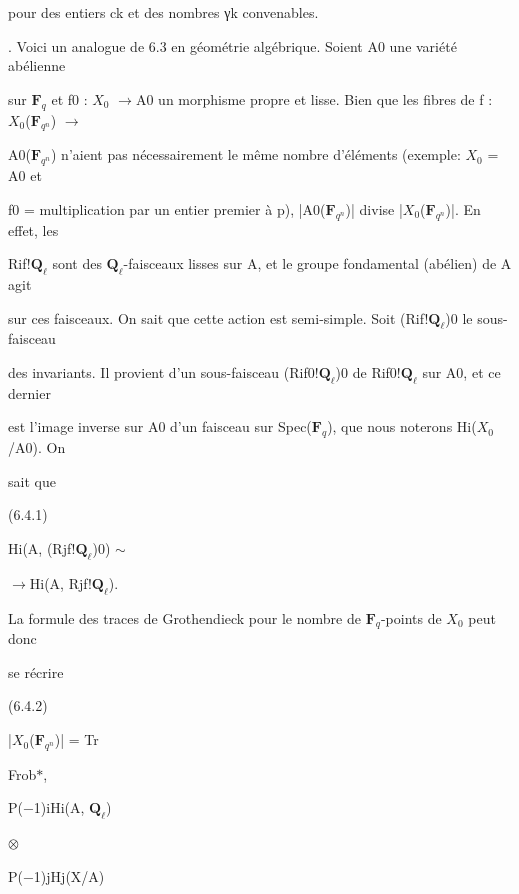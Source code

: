 \documentclass[11pt]{article}
\begin{document}
\noindent pour des entiers ck et des nombres γk convenables.\par
{}. Voici un analogue de 6.3 en géométrie algébrique. Soient A0 une variété abélienne\par
\noindent sur \(\mathbf F_q\) et f0 : \(X_0\) \(\to\)A0 un morphisme propre et lisse. Bien que les fibres de f : \(X_0\)(\(\mathbf F_{q^n}\)) \(\to\)\par
\noindent A0(\(\mathbf F_{q^n}\)) n’aient pas nécessairement le même nombre d’éléments (exemple: \(X_0\) = A0 et\par
\noindent f0 = multiplication par un entier premier à p), |A0(\(\mathbf F_{q^n}\))| divise |\(X_0\)(\(\mathbf F_{q^n}\))|. En effet, les\par
\noindent Rif!\(\mathbf Q_{\ell}\) sont des \(\mathbf Q_{\ell}\)-faisceaux lisses sur A, et le groupe fondamental (abélien) de A agit\par
\noindent sur ces faisceaux. On sait que cette action est semi-simple. Soit (Rif!\(\mathbf Q_{\ell}\))0 le sous-faisceau\par
\noindent des invariants. Il provient d’un sous-faisceau (Rif0!\(\mathbf Q_{\ell}\))0 de Rif0!\(\mathbf Q_{\ell}\) sur A0, et ce dernier\par
\noindent est l’image inverse sur A0 d’un faisceau sur Spec(\(\mathbf F_q\)), que nous noterons Hi(\(X_0\)/A0). On\par
\noindent sait que\par
\noindent (6.4.1)\par
\noindent Hi(A, (Rjf!\(\mathbf Q_{\ell}\))0) \(\sim\)\par
\noindent \(\to\)Hi(A, Rjf!\(\mathbf Q_{\ell}\)).\par
\noindent La formule des traces de Grothendieck pour le nombre de \(\mathbf F_q\)-points de \(X_0\) peut donc\par
\noindent se récrire\par
\noindent (6.4.2)\par
\noindent |\(X_0\)(\(\mathbf F_{q^n}\))| = Tr\par
\noindent \par
\noindent Frob\(*\),\par
\noindent P(−1)iHi(A, \(\mathbf Q_{\ell}\))\par
\noindent \par
\noindent \(\otimes\)\par
\noindent P(−1)jHj(X/A)\par
\noindent \par
\end{document}
